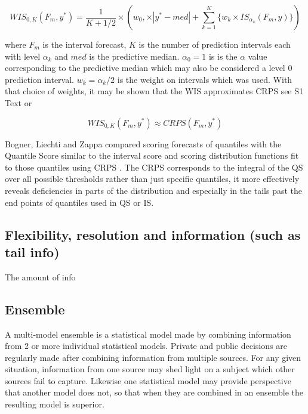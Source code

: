 \documentclass{article}\usepackage[]{graphicx}\usepackage[]{color}
\begin{document}
\begin{equation}
  WIS_{0,K}(F_m,y^*) = \frac{1}{K + 1/2} \times (w_0, \times |y^*-med|+
  \sum_{k=1}^K \{ w_k \times IS_{\alpha_k}(F_m,y) \} )
\end{equation}

where $F_m$ is the interval forecast, $K$ is the number of prediction intervals
each with level $\alpha_k$ and $med$ is the predictive median. $\alpha_0 = 1$ is 
is the $\alpha$ value corresponding to the predictive median which may also be
considered a level 0 prediction interval. $w_k = \alpha_k/2$ is the weight on
intervals which was used. With that choice of weights, it may be shown that the
WIS approximates CRPS see S1 Text  \cite{bracher2021evaluating} or

\begin{equation}
  WIS_{0,K}(F_m,y^*) \approx CRPS(F_m,y^*)
\end{equation}

Bogner, Liechti and Zappa compared scoring forecasts of quantiles with the 
Quantile Score similar to the interval score and scoring distribution functions
fit to those quantiles using CRPS \cite{bogner2017combining}. The CRPS 
corresponds to the integral of the QS over all possible thresholds rather than
just specific quantiles, it more effectively reveals deficiencies in parts of 
the distribution and especially in the tails past the end points of quantiles
used in QS or IS.





\subsection{Flexibility, resolution and information (such as tail info)}
The amount of info


\subsection{Ensemble}
A multi-model ensemble is a statistical model made by combining information from
2 or more individual statistical models. Private and public decisions are 
regularly made after combining information from multiple sources. For any given
situation, information from one source may shed light on a subject which other
sources fail to capture. Likewise one statistical model may provide perspective
that another model does not, so that when they are combined in an ensemble the 
resulting model is superior.
\end{document}
